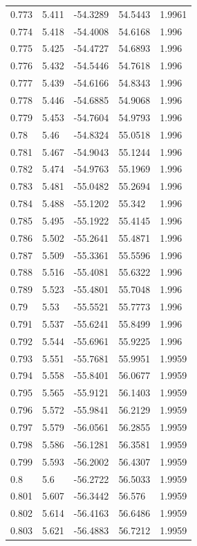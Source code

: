 \begin{tabular}{lllll}
0.773 & 5.411 & -54.3289 & 54.5443 & 1.9961 \\
0.774 & 5.418 & -54.4008 & 54.6168 & 1.996 \\
0.775 & 5.425 & -54.4727 & 54.6893 & 1.996 \\
0.776 & 5.432 & -54.5446 & 54.7618 & 1.996 \\
0.777 & 5.439 & -54.6166 & 54.8343 & 1.996 \\
0.778 & 5.446 & -54.6885 & 54.9068 & 1.996 \\
0.779 & 5.453 & -54.7604 & 54.9793 & 1.996 \\
0.78 & 5.46 & -54.8324 & 55.0518 & 1.996 \\
0.781 & 5.467 & -54.9043 & 55.1244 & 1.996 \\
0.782 & 5.474 & -54.9763 & 55.1969 & 1.996 \\
0.783 & 5.481 & -55.0482 & 55.2694 & 1.996 \\
0.784 & 5.488 & -55.1202 & 55.342 & 1.996 \\
0.785 & 5.495 & -55.1922 & 55.4145 & 1.996 \\
0.786 & 5.502 & -55.2641 & 55.4871 & 1.996 \\
0.787 & 5.509 & -55.3361 & 55.5596 & 1.996 \\
0.788 & 5.516 & -55.4081 & 55.6322 & 1.996 \\
0.789 & 5.523 & -55.4801 & 55.7048 & 1.996 \\
0.79 & 5.53 & -55.5521 & 55.7773 & 1.996 \\
0.791 & 5.537 & -55.6241 & 55.8499 & 1.996 \\
0.792 & 5.544 & -55.6961 & 55.9225 & 1.996 \\
0.793 & 5.551 & -55.7681 & 55.9951 & 1.9959 \\
0.794 & 5.558 & -55.8401 & 56.0677 & 1.9959 \\
0.795 & 5.565 & -55.9121 & 56.1403 & 1.9959 \\
0.796 & 5.572 & -55.9841 & 56.2129 & 1.9959 \\
0.797 & 5.579 & -56.0561 & 56.2855 & 1.9959 \\
0.798 & 5.586 & -56.1281 & 56.3581 & 1.9959 \\
0.799 & 5.593 & -56.2002 & 56.4307 & 1.9959 \\
0.8 & 5.6 & -56.2722 & 56.5033 & 1.9959 \\
0.801 & 5.607 & -56.3442 & 56.576 & 1.9959 \\
0.802 & 5.614 & -56.4163 & 56.6486 & 1.9959 \\
0.803 & 5.621 & -56.4883 & 56.7212 & 1.9959 \\

\end{tabular}
